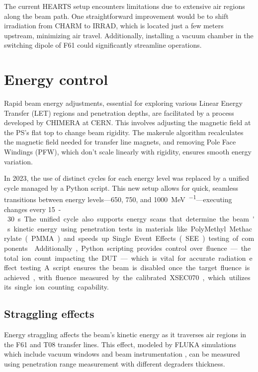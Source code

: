 \documentclass[a4paper,
               biblatex,     %
               ]{jacow}
\begin{document}
The current HEARTS setup encounters limitations due to extensive air regions along the beam path. One straightforward improvement would be to shift irradiation from CHARM to IRRAD, which is located just a few meters upstream, minimizing air travel. Additionally, installing a vacuum chamber in the switching dipole of F61 could significantly streamline operations.






\section{Energy control}

Rapid beam energy adjustments, essential for exploring various Linear Energy Transfer (LET) regions and penetration depths, are facilitated by a process developed by CHIMERA at CERN. This involves adjusting the magnetic field at the PS's flat top to change beam rigidity. The makerule algorithm recalculates the magnetic field needed for transfer line magnets, and removing Pole Face Windings (PFW), which don't scale linearly with rigidity, ensures smooth energy variation.

In 2023, the use of distinct cycles for each energy level was replaced by a unified cycle managed by a Python script. This new setup allows for quick, seamless transitions between energy levels—\SI{650}{}, \SI{750}{}, and \SI{1000}{\mega\electronvolt\per\nucleon}—executing changes every \SI{15}-\SI{30}{\second}. The unified cycle also supports energy scans that determine the beam's kinetic energy using penetration tests in materials like PolyMethyl Methacrylate (PMMA) and speeds up Single Event Effects (SEE) testing of components. \cite{noauthor_hearts_nodate}

Additionally, Python scripting provides control over fluence—the total ion count impacting the DUT—which is vital for accurate radiation effect testing. A script ensures the beam is disabled once the target fluence is achieved, with fluence measured by the calibrated XSEC070, which utilizes its single ion counting capability.

\subsection{Straggling effects}
Energy straggling affects the beam's kinetic energy as it traverses air regions in the F61 and T08 transfer lines. This effect, modeled by FLUKA simulations which include vacuum windows and beam instrumentation \cite{battistoni_overview_2015}, can be measured using penetration range measurement with different degraders thickness.
\end{document}
